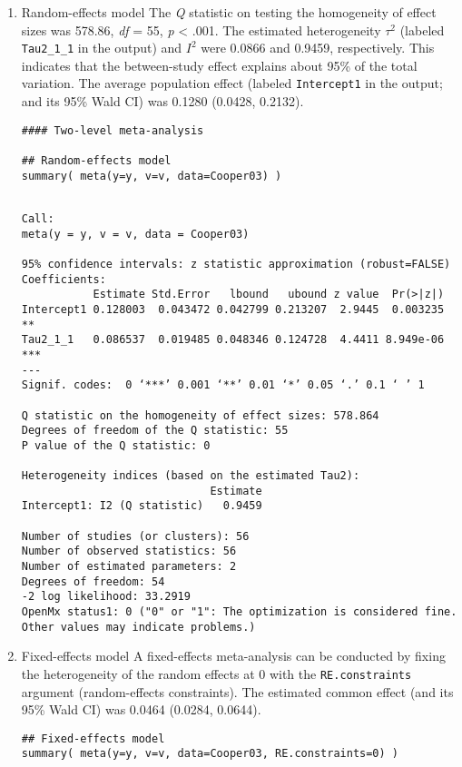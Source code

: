 \documentclass[11pt]{article}
\begin{document}
\begin{enumerate}
\item Random-effects model
\label{sec:org94c1e6a}
The \emph{Q} statistic on testing the homogeneity of effect sizes was 578.86, \emph{df} = 55, \emph{p} < .001. The estimated heterogeneity \(\tau^2\) (labeled \texttt{Tau2\_1\_1} in the output) and \(I^2\) were 0.0866 and 0.9459, respectively. This indicates that the between-study effect explains about 95\% of the total variation. The average population effect (labeled \texttt{Intercept1} in the output; and its 95\% Wald CI) was 0.1280 (0.0428, 0.2132).
\begin{verbatim}
#### Two-level meta-analysis

## Random-effects model  
summary( meta(y=y, v=v, data=Cooper03) )
\end{verbatim}

\begin{verbatim}

Call:
meta(y = y, v = v, data = Cooper03)

95% confidence intervals: z statistic approximation (robust=FALSE)
Coefficients:
           Estimate Std.Error   lbound   ubound z value  Pr(>|z|)    
Intercept1 0.128003  0.043472 0.042799 0.213207  2.9445  0.003235 ** 
Tau2_1_1   0.086537  0.019485 0.048346 0.124728  4.4411 8.949e-06 ***
---
Signif. codes:  0 ‘***’ 0.001 ‘**’ 0.01 ‘*’ 0.05 ‘.’ 0.1 ‘ ’ 1

Q statistic on the homogeneity of effect sizes: 578.864
Degrees of freedom of the Q statistic: 55
P value of the Q statistic: 0

Heterogeneity indices (based on the estimated Tau2):
                             Estimate
Intercept1: I2 (Q statistic)   0.9459

Number of studies (or clusters): 56
Number of observed statistics: 56
Number of estimated parameters: 2
Degrees of freedom: 54
-2 log likelihood: 33.2919 
OpenMx status1: 0 ("0" or "1": The optimization is considered fine.
Other values may indicate problems.)
\end{verbatim}

\item Fixed-effects model
\label{sec:orgb7b9a2f}
A fixed-effects meta-analysis can be conducted by fixing the heterogeneity of the random effects at 0 with the \texttt{RE.constraints} argument (random-effects constraints). The estimated common effect (and its 95\% Wald CI) was 0.0464 (0.0284, 0.0644).
\begin{verbatim}
## Fixed-effects model
summary( meta(y=y, v=v, data=Cooper03, RE.constraints=0) )
\end{verbatim}


\end{enumerate}
\end{document}
